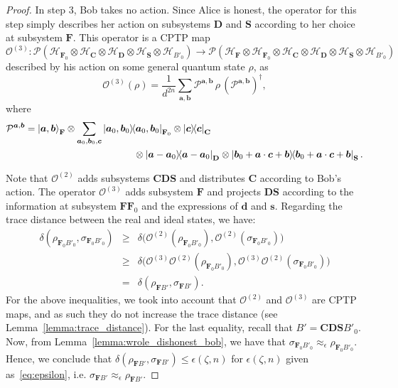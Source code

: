 \begin{proof}
In step 3, Bob takes no action. Since Alice is honest, the operator for this step simply describes her action on subsystems $\mathbf{D}$ and $\mathbf{S}$ according to her choice at subsystem $\mathbf{F}$. This operator is a CPTP map
$$\mathcal{O}^{(3)} :  \mathcal{P}\left(\mathcal{H}_{\mathbf{F}_0} \otimes \mathcal{H}_{\mathbf{C}} \otimes \mathcal{H}_{\mathbf{D}} \otimes \mathcal{H}_{\mathbf{S}} \otimes \mathcal{H}_{B'_0}\right) \rightarrow \mathcal{P}\left(\mathcal{H}_{\mathbf{F}} \otimes \mathcal{H}_{\mathbf{F}_0} \otimes \mathcal{H}_{\mathbf{C}} \otimes \mathcal{H}_{\mathbf{D}} \otimes \mathcal{H}_{\mathbf{S}} \otimes \mathcal{H}_{B'_0}\right)$$
described by his action on some general quantum state $\rho$, as
\begin{equation*}
    \mathcal{O}^{(3)}(\rho) = \frac{1}{d^{2n}} \sum_{\bm{a}, \bm{b}} \mathcal{P}^{\bm{a}, \bm{b}}\, \rho \, (\mathcal{P}^{\bm{a}, \bm{b} })^\dagger,
\end{equation*}
where 
\begin{align*}
\mathcal{P}^{\bm{a}, \bm{b}} &= \ket{\bm{a}, \bm{b}}_{\mathbf{F}} \otimes \sum_{\bm{a}_0, \bm{b}_0, \bm{c}} \ketbra{\bm{a}_0, \bm{b}_0}_{\mathbf{F}_0} \otimes \ketbra{\bm{c}}_{\mathbf{C}} \\
&\hspace{4cm}\otimes \ketbra{\bm{a} - \bm{a}_0}_{\mathbf{D}} \otimes \ketbra{\bm{b}_0 + \bm{a} \cdot \bm{c} + \bm{b}}_{\mathbf{S}}. \nonumber
\end{align*}

Note that $\mathcal{O}^{(2)}$ adds subsystems $\mathbf{C} \mathbf{D} \mathbf{S}$ and distributes $\mathbf{C}$ according to Bob's action. The operator $\mathcal{O}^{(3)}$ adds subsystem $\mathbf{F}$ and projects $\mathbf{D} \mathbf{S}$ according to the information at subsystem $\mathbf{F} \mathbf{F}_0$ and the expressions of $\bm{d}$ and $\bm{s}$. Regarding the trace distance between the real and ideal states, we have: 
\begin{eqnarray*}
\delta(\rho_{\mathbf{F}_0 B'_0} , \sigma_{\mathbf{F}_0 B'_0}) &\geq& \delta\Big( \mathcal{O}^{(2)}(\rho_{\mathbf{F}_0 B'_0}), \mathcal{O}^{(2)}(\sigma_{\mathbf{F}_0 B'_0})\Big) \\
&\geq& \delta\Big( \mathcal{O}^{(3)} \mathcal{O}^{(2)}(\rho_{\mathbf{F}_0 B'_0}), \mathcal{O}^{(3)} \mathcal{O}^{(2)}(\sigma_{\mathbf{F}_0 B'_0})\Big)\\ 
&=& \delta( \rho_{\mathbf{F} B'}, \sigma_{\mathbf{F} B'}).
\end{eqnarray*}
For the above inequalities, we took into account that $\mathcal{O}^{(2)}$ and $\mathcal{O}^{(3)}$ are CPTP maps, and as such they do not increase the trace distance (see Lemma~\ref{lemma:trace_distance}). For the last equality, recall that $B' = \bm{C}\bm{D}\bm{S}B'_0$. Now, from  Lemma~\ref{lemma:wrole_dishonest_bob}, we have that $\sigma_{\mathbf{F}_0 B'_0} \approx_{\epsilon} \rho_{\mathbf{F}_0 B'_0}$.
Hence, we conclude that $\delta( \rho_{\mathbf{F} B'}, \sigma_{\mathbf{F} B'}) \leq \epsilon(\zeta, n)$ for $\epsilon(\zeta, n)$ given as~\eqref{eq:epsilon}, i.e. $\sigma_{\mathbf{F} B'} \approx_{\epsilon} \rho_{\mathbf{F} B'}$.


\end{proof}
